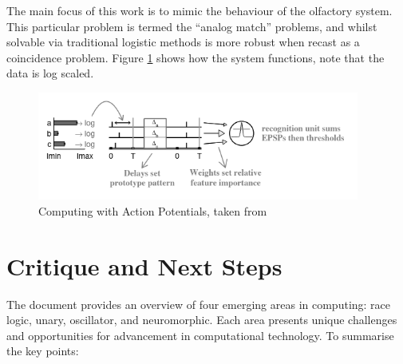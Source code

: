 \documentclass{article}
\begin{document}
The main focus of this work is to mimic the behaviour of the olfactory system. This particular problem is termed the ``analog match'' problems, and whilst solvable via traditional logistic methods is more robust when recast as a coincidence problem. Figure \ref{fig:carlos} shows how the system functions, note that the data is log scaled.

\begin{figure}
  \centerline{\includegraphics[width=300pt]{figures/carlos.png}}
  \caption{Computing with Action Potentials, taken from \cite{hopfield1995pattern}}\label{fig:carlos}
\end{figure}

\section{Critique and Next Steps}

The document provides an overview of four emerging areas in computing: race logic, unary, oscillator, and neuromorphic. Each area presents unique challenges and opportunities for advancement in computational technology. To summarise the key points:
\end{document}
